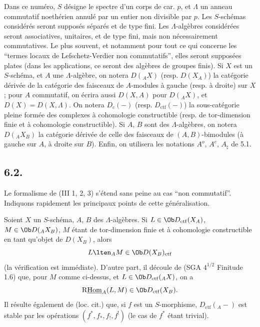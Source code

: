 Dans ce numéro, $S$ désigne le spectre d'un corps de car. $p$, et $\Lambda$ un anneau commutatif noethérien annulé par un entier non divisible par $p$. Les $S$-schémas considérés seront supposés séparés et de type fini. Les $\Lambda$-algèbres considérées seront associatives, unitaires, et de type fini, mais non nécessairement commutatives. Le plus souvent, et notamment pour tout ce qui concerne les ``termes locaux de Lefschetz-Verdier non commutatifs'', elles seront supposées plates (dans les applications, ce seront des algèbres de groupes finis). Si $X$ est un $S$-schéma, et $A$ une $\Lambda$-algèbre, on notera $D({}_AX)$ (resp. $D(X_A)$) la catégorie dérivée de la catégorie des faisceaux de $A$-modules à gauche (resp. à droite) sur $X$; pour $A$ commutatif, on écrira aussi $D(X,A)$ pour $D({}_AX)$, et $D(X)=D(X,\Lambda)$. On notera $D_c(-)$ (resp. $D_{\mathrm{ctf}}(-)$) la sous-catégorie pleine formée des complexes à cohomologie constructible (resp. de tor-dimension finie et à cohomologie constructible). Si $A$, $B$ sont des $\Lambda$-algèbres, on notera $D({}_AX_B)$ la catégorie dérivée de celle des faisceaux de $(A,B)$-bimodules (à gauche sur $A$, à droite sur $B$). Enfin, on utilisera les notations $A^o$, $A^e$, $A_{\natural}$ de 5.1.

\subsection*{6.2.}
Le formalisme de (III 1, 2, 3) s'étend sans peine au cas ``non commutatif''. Indiquons rapidement les principaux points de cette généralisation.

Soient $X$ un $S$-schéma, $A$, $B$ des $\Lambda$-algèbres. Si $L\in\Ob D_{\mathrm{ctf}}(X_A)$, $M\in\Ob D({}_AX_B)$, $M$ étant de tor-dimension finie et à cohomologie constructible en tant qu'objet de $D(X_B)$, alors
\[
L\lten_A M\in\Ob D(X_B)_{\mathrm{ctf}}
\]
(la vérification est immédiate). D'autre part, il découle de (SGA $4^{1/2}$ Finitude 1.6) que, pour $M$ comme ci-dessus, et $L\in\Ob D_{\mathrm{ctf}}({}_AX)$, on a
\[
\mathrm{R}\underline{\mathrm{Hom}}_A(L,M)\in\Ob D_{\mathrm{ctf}}(X_B).
\]
Il résulte également de (loc. cit.) que, si $f$ est un $S$-morphisme, $D_{\mathrm{ctf}}({}_A-)$ est stable par les opérations $(f^*,f_*,f_!,f^!)$ (le cas de $f^*$ étant trivial).

